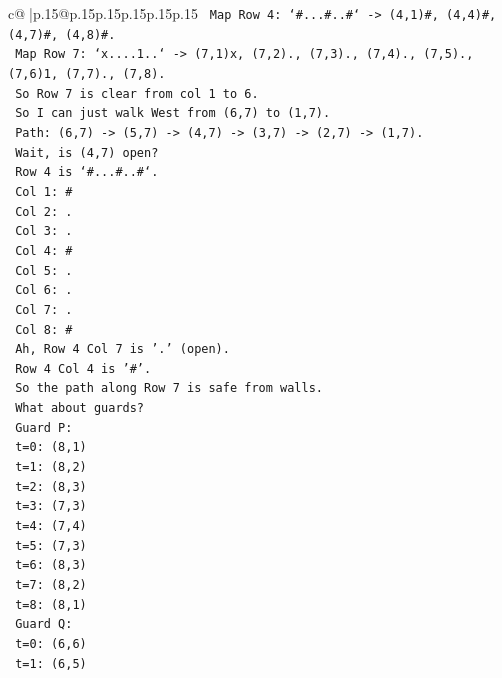 \documentclass{article}
\begin{document}
{\begin{supertabular}{c@{$\;$}|p{.15\linewidth}@{}p{.15\linewidth}p{.15\linewidth}p{.15\linewidth}p{.15\linewidth}p{.15\linewidth}}
{{{\texttt{         Map Row 4: `\#...\#..\#` {-}> (4,1)\#, (4,4)\#, (4,7)\#, (4,8)\#.} \\
\texttt{         Map Row 7: `x....1..` {-}> (7,1)x, (7,2)., (7,3)., (7,4)., (7,5)., (7,6)1, (7,7)., (7,8).} \\
\texttt{         So Row 7 is clear from col 1 to 6.} \\
\texttt{         So I can just walk West from (6,7) to (1,7).} \\
\texttt{         Path: (6,7) {-}> (5,7) {-}> (4,7) {-}> (3,7) {-}> (2,7) {-}> (1,7).} \\
\texttt{         Wait, is (4,7) open?} \\
\texttt{         Row 4 is `\#...\#..\#`.} \\
\texttt{         Col 1: \#} \\
\texttt{         Col 2: .} \\
\texttt{         Col 3: .} \\
\texttt{         Col 4: \#} \\
\texttt{         Col 5: .} \\
\texttt{         Col 6: .} \\
\texttt{         Col 7: .} \\
\texttt{         Col 8: \#} \\
\texttt{         Ah, Row 4 Col 7 is '.' (open).} \\
\texttt{         Row 4 Col 4 is '\#'.} \\
\texttt{         So the path along Row 7 is safe from walls.} \\
\texttt{         What about guards?} \\
\texttt{         Guard P:} \\
\texttt{         t=0: (8,1)} \\
\texttt{         t=1: (8,2)} \\
\texttt{         t=2: (8,3)} \\
\texttt{         t=3: (7,3)} \\
\texttt{         t=4: (7,4)} \\
\texttt{         t=5: (7,3)} \\
\texttt{         t=6: (8,3)} \\
\texttt{         t=7: (8,2)} \\
\texttt{         t=8: (8,1)} \\
\texttt{         Guard Q:} \\
\texttt{         t=0: (6,6)} \\
\texttt{         t=1: (6,5)} \\
}}}
\end{supertabular}}
\end{document}
